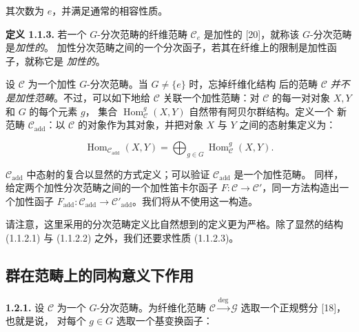 \clearpage
{}%
其次数为 $e$，并满足通常的相容性质。

\noindent\textbf{定义 1.1.3.}\quad
若一个 $G$-分次范畴的纤维范畴 $\mathcal C_e$ 是加性的 [20]，就称该
$G$-分次范畴是\emph{加性的}。
加性分次范畴之间的一个分次函子，若其在纤维上的限制是加性函子，就称它是
\emph{加性的}。

设 $\mathcal C$ 为一个加性 $G$-分次范畴。当 $G\neq\{e\}$ 时，忘掉纤维化结构
后的范畴 $\mathcal C$ \emph{并不是加性范畴}。不过，可以如下地给 $\mathcal C$
关联一个加性范畴：对 $\mathcal C$ 的每一对对象 $X,Y$ 和 $G$ 的每个元素 $g$，
集合 $\operatorname{Hom}_{\mathcal C}^{g}(X,Y)$ 自然带有阿贝尔群结构。定义一个
新范畴 $\mathcal C_{\mathrm{add}}$：以 $\mathcal C$ 的对象作为其对象，并把对象
$X$ 与 $Y$ 之间的态射集定义为：

\begingroup
\makeatletter
\tagsleft@true
\let\veqno\@@leqno
\makeatother
\begin{equation}
  \operatorname{Hom}_{\mathcal C_{\mathrm{add}}}(X,Y)
  =\bigoplus_{g\in G}\operatorname{Hom}_{\mathcal C}^{g}(X,Y).
  \tag{1.1.3.1}
\end{equation}
\endgroup

$\mathcal C_{\mathrm{add}}$ 中态射的复合以显然的方式定义；可以验证
$\mathcal C_{\mathrm{add}}$ 是一个加性范畴。
同样，给定两个加性分次范畴之间的一个加性笛卡尔函子
$F\colon\mathcal C\to\mathcal C'$，同一方法构造出一个加性函子
$F_{\mathrm{add}}\colon\mathcal C_{\mathrm{add}}\to
\mathcal C'_{\mathrm{add}}$。我们将从不使用这一构造。

请注意，这里采用的分次范畴定义比自然想到的定义更为严格。除了显然的结构
(1.1.2.1) 与 (1.1.2.2) 之外，我们还要求性质 (1.1.2.3)。

\subsection{群在范畴上的同构意义下作用}

\noindent\textbf{1.2.1.}\quad
设 $\mathcal C$ 为一个 $G$-分次范畴。为纤维化范畴
$\mathcal C\xrightarrow{\deg}\mathcal G$ 选取一个正规劈分 [18]，也就是说，
对每个 $g\in G$ 选取一个基变换函子：

